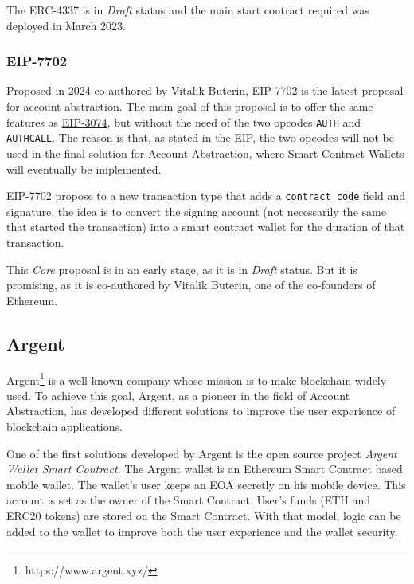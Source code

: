 The ERC-4337 is in \textit{Draft} status and the main start contract required was deployed in March 2023. \cite{ethereum-roadmap-ux}

\subsubsection{EIP-7702}

Proposed in 2024 co-authored by Vitalik Buterin, EIP-7702 is the latest proposal for account abstraction. The main goal of this proposal is to offer the same features as \hyperref[subsubsec:eip-3074]{EIP-3074}, but without the need of the two opcodes \texttt{AUTH} and \texttt{AUTHCALL}. The reason is that, as stated in the EIP, the two opcodes will not be used in the final solution for Account Abstraction, where Smart Contract Wallets will eventually be implemented. \cite{eip-7702}

EIP-7702 propose to a new transaction type that adds a \texttt{contract\_code} field and signature, the idea is to convert the signing account (not necessarily the same that started the transaction) into a smart contract wallet for the duration of that transaction. \cite{eip-7702}

This \textit{Core} proposal is in an early stage, as it is in \textit{Draft} status. But it is promising, as it is co-authored by Vitalik Buterin, one of the co-founders of Ethereum.

\subsection{Argent}
\label{subsec:argent}

Argent\footnote{https://www.argent.xyz/} is a well known company whose mission is to make blockchain widely used. To achieve this goal, Argent, as a pioneer in the field of Account Abstraction, has developed different solutions to improve the user experience of blockchain applications. \cite{argent-aa}

One of the first solutions developed by Argent is the open source project \textit{Argent Wallet Smart Contract}. The Argent wallet is an Ethereum Smart Contract based mobile wallet. The wallet's user keeps an EOA secretly on his mobile device. This account is set as the owner of the Smart Contract. User's funds (ETH and ERC20 tokens) are stored on the Smart Contract. With that model, logic can be added to the wallet to improve both the user experience and the wallet security. \cite{argent-github}


